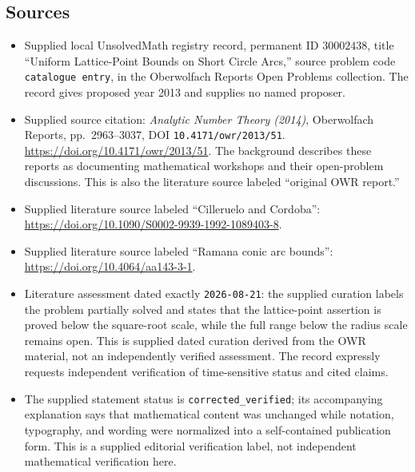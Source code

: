 \documentclass[11pt]{article}
\begin{document}
\subsection{Sources}
\begin{itemize}
\item Supplied local UnsolvedMath registry record, permanent ID \(30002438\), title ``Uniform Lattice-Point Bounds on Short Circle Arcs,'' source problem code \texttt{catalogue entry}, in the Oberwolfach Reports Open Problems collection. The record gives proposed year 2013 and supplies no named proposer.
\item Supplied source citation: \emph{Analytic Number Theory (2014)}, Oberwolfach Reports, pp.\ 2963--3037, DOI \texttt{10.4171/owr/2013/51}. \url{https://doi.org/10.4171/owr/2013/51}. The background describes these reports as documenting mathematical workshops and their open-problem discussions. This is also the literature source labeled ``original OWR report.''
\item Supplied literature source labeled ``Cilleruelo and Cordoba'': \url{https://doi.org/10.1090/S0002-9939-1992-1089403-8}.
\item Supplied literature source labeled ``Ramana conic arc bounds'': \url{https://doi.org/10.4064/aa143-3-1}.
\item Literature assessment dated exactly \texttt{2026-08-21}: the supplied curation labels the problem partially solved and states that the lattice-point assertion is proved below the square-root scale, while the full range below the radius scale remains open. This is supplied dated curation derived from the OWR material, not an independently verified assessment. The record expressly requests independent verification of time-sensitive status and cited claims.
\item The supplied statement status is \texttt{corrected\_verified}; its accompanying explanation says that mathematical content was unchanged while notation, typography, and wording were normalized into a self-contained publication form. This is a supplied editorial verification label, not independent mathematical verification here.
\end{itemize}
\end{document}
